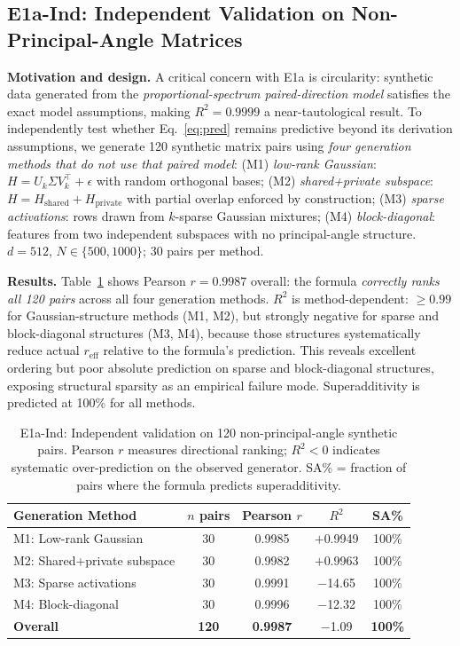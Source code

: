 \documentclass{article}
\begin{document}
\subsection{E1a-Ind: Independent Validation on Non-Principal-Angle Matrices}
\label{sec:e1a_ind}

\textbf{Motivation and design.}
A critical concern with E1a is circularity: synthetic data generated from the
\emph{proportional-spectrum paired-direction model} satisfies the exact
model assumptions,
making $R^2=0.9999$ a near-tautological result.
To independently test whether Eq.~\eqref{eq:pred} remains predictive
beyond its derivation assumptions, we generate 120 synthetic matrix pairs
using \emph{four generation methods that do not use that paired model}:
(M1) \emph{low-rank Gaussian}: $H=U_k\Sigma V_k^\top + \epsilon$ with random orthogonal bases;
(M2) \emph{shared+private subspace}: $H=H_{\mathrm{shared}}+H_{\mathrm{private}}$ with
partial overlap enforced by construction;
(M3) \emph{sparse activations}: rows drawn from $k$-sparse Gaussian mixtures;
(M4) \emph{block-diagonal}: features from two independent subspaces with no principal-angle structure.
$d=512$, $N\in\{500,1000\}$; 30 pairs per method.

\textbf{Results.}
Table~\ref{tab:e1a_ind} shows Pearson $r=0.9987$ overall: the formula
\emph{correctly ranks all 120 pairs} across all four generation methods.
$R^2$ is method-dependent: $\geq0.99$ for Gaussian-structure methods (M1, M2),
but strongly negative for sparse and block-diagonal structures (M3, M4),
because those structures systematically reduce actual $r_{\mathrm{eff}}$ relative to the formula's prediction.
This reveals excellent ordering but poor absolute prediction on sparse and
block-diagonal structures, exposing structural sparsity as an empirical
failure mode.
Superadditivity is predicted at 100\% for all methods.

\begin{table}[t]
\centering
\caption{E1a-Ind: Independent validation on 120 non-principal-angle synthetic pairs.
Pearson $r$ measures directional ranking; $R^2<0$ indicates systematic
over-prediction on the observed generator. SA\% = fraction of pairs where
the formula predicts superadditivity.}
\label{tab:e1a_ind}
\setlength{\tabcolsep}{5pt}
\begin{tabular}{lcccc}
\toprule
Generation Method & $n$ pairs & Pearson $r$ & $R^2$ & SA\% \\
\midrule
M1: Low-rank Gaussian      & 30 & 0.9985 & $+$0.9949 & 100\% \\
M2: Shared+private subspace & 30 & 0.9982 & $+$0.9963 & 100\% \\
M3: Sparse activations     & 30 & 0.9991 & $-$14.65  & 100\% \\
M4: Block-diagonal         & 30 & 0.9996 & $-$12.32  & 100\% \\
\midrule
\textbf{Overall}           & \textbf{120} & \textbf{0.9987} & $-$1.09 & \textbf{100\%} \\
\bottomrule
\end{tabular}
\end{table}
\end{document}
